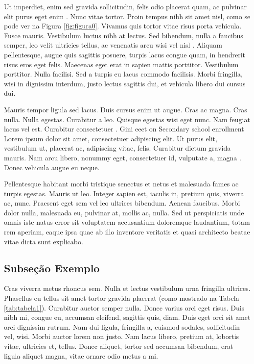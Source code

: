 Ut imperdiet, enim sed gravida sollicitudin, felis odio placerat quam, ac pulvinar elit purus eget enim \citep{Gubitoso1992}. Nunc vitae tortor. Proin tempus nibh sit amet nisl, como se pode ver na Figura \ref{fig:figura0}. Vivamus quis tortor vitae risus porta vehicula. Fusce mauris. Vestibulum luctus nibh at lectus. Sed bibendum, nulla a faucibus semper, leo velit ultricies tellus, ac venenatis arcu wisi vel nisl \citep{icse2015}. Aliquam pellentesque, augue quis sagittis posuere, turpis lacus congue quam, in hendrerit risus eros eget felis. Maecenas eget erat in sapien mattis porttitor\footnotemark. Vestibulum porttitor. Nulla facilisi. Sed a turpis eu lacus commodo facilisis. Morbi fringilla, wisi in dignissim interdum, justo lectus sagittis dui, et vehicula libero dui cursus dui.


Mauris tempor ligula sed lacus. Duis cursus enim ut augue. Cras ac magna. Cras nulla. Nulla egestas. Curabitur a leo. Quisque egestas wisi eget nunc. Nam feugiat lacus vel est. Curabitur consectetuer \citep{Araujo2015}. Gini eect on Secondary school enrollment Lorem ipsum dolor sit amet, consectetuer adipiscing elit. Ut purus elit, vestibulum ut, placerat ac, adipiscing vitae, felis. Curabitur dictum gravida mauris. Nam arcu libero, nonummy eget, consectetuer id, vulputate a, magna \citep{Folha2015}. Donec vehicula augue eu neque.

Pellentesque habitant morbi tristique senectus et netus et malesuada fames ac turpis egestas. Mauris ut leo. Integer sapien est, iaculis in, pretium quis, viverra ac, nunc. Praesent eget sem vel leo ultrices bibendum. Aenean faucibus. Morbi dolor nulla, malesuada eu, pulvinar at, mollis ac, nulla. Sed ut perspiciatis unde omnis iste natus error sit voluptatem accusantium doloremque laudantium, totam rem aperiam, eaque ipsa quae ab illo inventore veritatis et quasi architecto beatae vitae dicta sunt explicabo.

\subsection{Subseção Exemplo}
Cras viverra metus rhoncus sem. Nulla et lectus vestibulum urna fringilla ultrices. Phasellus eu tellus sit amet tortor gravida placerat (como mostrado na Tabela \ref{tab:tabela1}). Curabitur auctor semper nulla. Donec varius orci eget risus. Duis nibh mi, congue eu, accumsan eleifend, sagittis quis, diam. Duis eget orci sit amet orci dignissim rutrum. Nam dui ligula, fringilla a, euismod sodales, sollicitudin vel, wisi. Morbi auctor lorem non justo. Nam lacus libero, pretium at, lobortis vitae, ultricies et, tellus. Donec aliquet, tortor sed accumsan bibendum, erat ligula aliquet magna, vitae ornare odio metus a mi.

